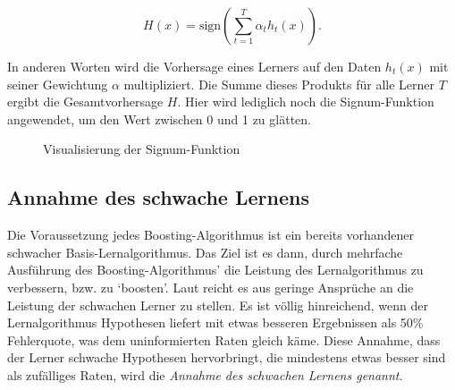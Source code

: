 \begin{equation}
    H(x) = \text{sign}\left(\sum_{t=1}^{T} \alpha_t h_t(x)\right).
\end{equation}
    
In anderen Worten wird die Vorhersage eines Lerners auf den Daten \( h_t(x) \) mit seiner Gewichtung \( \alpha \) multipliziert. Die Summe dieses Produkts für alle Lerner \( T \) ergibt die Gesamtvorhersage \( H \). Hier wird lediglich noch die Signum-Funktion angewendet, um den Wert zwischen 0 und 1 zu glätten.

\begin{figure}[h]
    \centering
    \caption{Visualisierung der Signum-Funktion}
    \label{fig:signum_function}
\end{figure}

\subsection{Annahme des schwache Lernens}
\label{sec:assumptionOfWeakLearning}
Die Voraussetzung jedes Boosting-Algorithmus ist ein bereits vorhandener schwacher Basis-Lernalgorithmus. Das Ziel ist es dann, durch mehrfache Ausführung des Boosting-Algorithmus' die Leistung des Lernalgorithmus zu verbessern, bzw. zu `boosten'. Laut \textcite[S. S.~4]{SchapireFreund2012} reicht es aus geringe Ansprüche an die Leistung der schwachen Lerner zu stellen. Es ist völlig hinreichend, wenn der Lernalgorithmus Hypothesen liefert mit etwas besseren Ergebnissen als 50\% Fehlerquote, was dem uninformierten Raten gleich käme.
\newline
Diese Annahme, dass der Lerner schwache Hypothesen hervorbringt, die mindestens etwas besser sind als zufälliges Raten, wird die \textit{Annahme des schwachen Lernens genannt}.